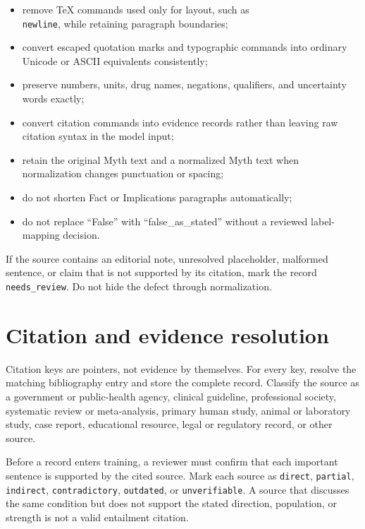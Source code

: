\documentclass[11pt,oneside]{book}
\begin{document}
\begin{itemize}
\item remove TeX commands used only for layout, such as \texttt{\\newline}, while retaining paragraph boundaries;
\item convert escaped quotation marks and typographic commands into ordinary Unicode or ASCII equivalents consistently;
\item preserve numbers, units, drug names, negations, qualifiers, and uncertainty words exactly;
\item convert citation commands into evidence records rather than leaving raw citation syntax in the model input;
\item retain the original Myth text and a normalized Myth text when normalization changes punctuation or spacing;
\item do not shorten Fact or Implications paragraphs automatically;
\item do not replace ``False'' with ``false\_as\_stated'' without a reviewed label-mapping decision.
\end{itemize}

If the source contains an editorial note, unresolved placeholder, malformed sentence, or claim that is not supported by its citation, mark the record \texttt{needs\_review}. Do not hide the defect through normalization.

\section{Citation and evidence resolution}

Citation keys are pointers, not evidence by themselves. For every key, resolve the matching bibliography entry and store the complete record. Classify the source as a government or public-health agency, clinical guideline, professional society, systematic review or meta-analysis, primary human study, animal or laboratory study, case report, educational resource, legal or regulatory record, or other source.

Before a record enters training, a reviewer must confirm that each important sentence is supported by the cited source. Mark each source as \texttt{direct}, \texttt{partial}, \texttt{indirect}, \texttt{contradictory}, \texttt{outdated}, or \texttt{unverifiable}. A source that discusses the same condition but does not support the stated direction, population, or strength is not a valid entailment citation.
\end{document}
